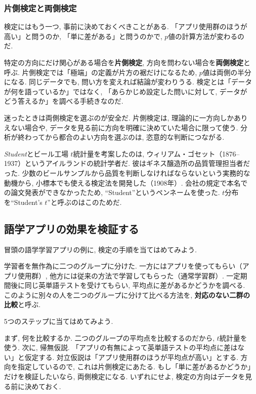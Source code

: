     \subsubsection*{片側検定と両側検定}

    検定にはもう一つ, 事前に決めておくべきことがある.
    「アプリ使用群のほうが高い」と問うのか, 「単に差がある」と問うのかで, $p$値の計算方法が変わるのだ.

    特定の方向にだけ関心がある場合を\textbf{片側検定}, 方向を問わない場合を\textbf{両側検定}と呼ぶ.
    片側検定では「極端」の定義が片方の裾だけになるため, $p$値は両側の半分になる.
    同じデータでも, 問い方を変えれば結論が変わりうる.
    検定とは「データが何を語っているか」ではなく, 「あらかじめ設定した問いに対して, データがどう答えるか」を調べる手続きなのだ.

    迷ったときは両側検定を選ぶのが安全だ.
    片側検定は, 理論的に一方向しかありえない場合や, データを見る前に方向を明確に決めていた場合に限って使う.
    分析が終わってから都合のよい方向を選ぶのは, 恣意的な判断につながる.

    \begin{mybox}{\textit{Student}とビール工場}
      $t$統計量を考案したのは, ウィリアム・ゴセット（1876--1937）というアイルランドの統計学者だ.
      彼はギネス醸造所の品質管理担当者だった.
      少数のビールサンプルから品質を判断しなければならないという実務的な動機から,
      小標本でも使える検定法を開発した（1908年）.
      会社の規定で本名での論文発表ができなかったため, ``Student''というペンネームを使った.
      $t$分布を``Student's $t$''と呼ぶのはこのためだ.
    \end{mybox}


  \subsection{語学アプリの効果を検証する}

    冒頭の語学学習アプリの例に, 検定の手順を当てはめてみよう.

    学習者を無作為に二つのグループに分けた.
    一方にはアプリを使ってもらい（アプリ使用群）,
    他方には従来の方法で学習してもらった（通常学習群）.
    一定期間後に同じ英単語テストを受けてもらい, 平均点に差があるかどうかを調べる.
    このように別々の人を二つのグループに分けて比べる方法を, \textbf{対応のない二群の比較}と呼ぶ.

    5つのステップに当てはめてみよう.

    まず, 何を比較するか. 二つのグループの平均点を比較するのだから, $t$統計量を使う.
    次に, 帰無仮説. 「アプリの有無によって英単語テストの平均点に差はない」と仮定する.
    対立仮説は「アプリ使用群のほうが平均点が高い」とする.
    方向を指定しているので, これは片側検定にあたる.
    もし「単に差があるかどうか」だけを検証したいなら, 両側検定になる.
    いずれにせよ, 検定の方向はデータを見る前に決めておく.

